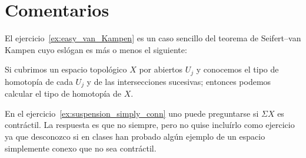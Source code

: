 \documentclass[11pt, reqno]{amsart}
\begin{document}


\section*{Comentarios}
El ejercicio~\ref{ex:easy_van_Kampen} es un caso sencillo del teorema de Seifert--van Kampen cuyo eslógan es más o menos el siguiente:
\begin{displayquote}
	Si cubrimos un espacio topológico $X$ por abiertos $U_j$ y conocemos el tipo de homotopía de cada $U_j$ y de las intersecciones
	sucesivas; entonces podemos calcular el tipo de homotopía de $X$.
\end{displayquote}
En el ejercicio~\ref{ex:suspension_simply_conn} uno puede preguntarse si $\Sigma X$ es contráctil.
La respuesta es que no siempre, pero no quise incluírlo como ejercicio ya que desconozco si en clases han probado algún ejemplo de un
espacio simplemente conexo que no sea contráctil.

\printbibliography
\end{document}
